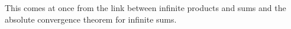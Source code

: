 \documentclass[12pt]{article}
\begin{document}
This comes at once from the link between infinite products and sums and the absolute convergence theorem for infinite sums.
\end{document}
